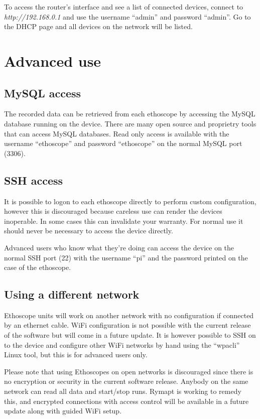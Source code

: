 To access the router's interface and see a list of connected devices, connect to \textit{http://192.168.0.1} and
use the username ``admin'' and password ``admin''. Go to the DHCP page and all devices on the network will be
listed.

\section{Advanced use}\label{sec:advanced}
\subsection{MySQL access}\label{subsec:mysql}
The recorded data can be retrieved from each ethoscope by accessing the MySQL database running on
the device. There are many open source and proprietry tools that can access MySQL databases. Read
only access is available with the username ``ethoscope'' and password ``ethoscope'' on the normal MySQL
port (3306).
 
\subsection{SSH access}\label{subsec:mysql}
It is possible to logon to each ethoscope directly to perform custom configuration, however this is
discouraged because careless use can render the devices inoperable. In some cases this can invalidate
your warranty. For normal use it should never be necessary to access the device directly.

Advanced users who know what they're doing can access the device on the normal SSH port (22) with
the username ``pi'' and the password printed on the case of the ethoscope.

\subsection{Using a different network}\label{subsec:mysql}
Ethoscope units will work on another network with no configuration if connected by an ethernet cable.
WiFi configuration is not possible with the current release of the software but will come in a
future update. It is however possible to SSH on to the device and configure other WiFi networks by
hand using the ``wpa\textunderscore{}cli'' Linux tool, but this is for advanced users only.

Please note that using Ethoscopes on open networks is discouraged since there is no encryption or
security in the current software release. Anybody on the same network can read all data and
start/stop runs. Rymapt is working to remedy this, and encrypted connections with access control
will be available in a future update along with guided WiFi setup.
